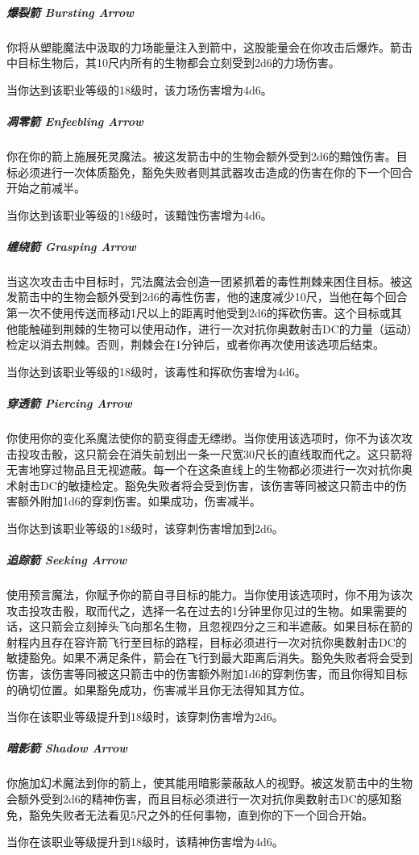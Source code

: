 \subparagraph{爆裂箭 Bursting Arrow}你将从塑能魔法中汲取的力场能量注入到箭中，这股能量会在你攻击后爆炸。箭击中目标生物后，其10尺内所有的生物都会立刻受到2d6的力场伤害。

当你达到该职业等级的18级时，该力场伤害增为4d6。

\subparagraph{凋零箭 Enfeebling Arrow}你在你的箭上施展死灵魔法。被这发箭击中的生物会额外受到2d6的黯蚀伤害。目标必须进行一次体质豁免，豁免失败者则其武器攻击造成的伤害在你的下一个回合开始之前减半。

当你达到该职业等级的18级时，该黯蚀伤害增为4d6。

\subparagraph{缠绕箭 Grasping Arrow}当这次攻击击中目标时，咒法魔法会创造一团紧抓着的毒性荆棘来困住目标。被这发箭击中的生物会额外受到2d6的毒性伤害，他的速度减少10尺，当他在每个回合第一次不使用传送而移动1尺以上的距离时他受到2d6的挥砍伤害。这个目标或其他能触碰到荆棘的生物可以使用动作，进行一次对抗你奥数射击DC的力量（运动）检定以消去荆棘。否则，荆棘会在1分钟后，或者你再次使用该选项后结束。

当你达到该职业等级的18级时，该毒性和挥砍伤害增为4d6。

\subparagraph{穿透箭 Piercing Arrow}你使用你的变化系魔法使你的箭变得虚无缥缈。当你使用该选项时，你不为该次攻击投攻击骰，这只箭会在消失前划出一条一尺宽30尺长的直线取而代之。这只箭将无害地穿过物品且无视遮蔽。每一个在这条直线上的生物都必须进行一次对抗你奥术射击DC的敏捷检定。豁免失败者将会受到伤害，该伤害等同被这只箭击中的伤害额外附加1d6的穿刺伤害。如果成功，伤害减半。

当你达到该职业等级的18级时，该穿刺伤害增加到2d6。

\subparagraph{追踪箭 Seeking Arrow}使用预言魔法，你赋予你的箭自寻目标的能力。当你使用该选项时，你不用为该次攻击投攻击骰，取而代之，选择一名在过去的1分钟里你见过的生物。如果需要的话，这只箭会立刻掉头飞向那名生物，且忽视四分之三和半遮蔽。如果目标在箭的射程内且存在容许箭飞行至目标的路程，目标必须进行一次对抗你奥数射击DC的敏捷豁免。如果不满足条件，箭会在飞行到最大距离后消失。豁免失败者将会受到伤害，该伤害等同被这只箭击中的伤害额外附加1d6的穿刺伤害，而且你得知目标的确切位置。如果豁免成功，伤害减半且你无法得知其方位。

当你在该职业等级提升到18级时，该穿刺伤害增为2d6。

\subparagraph{暗影箭 Shadow Arrow}你施加幻术魔法到你的箭上，使其能用暗影蒙蔽敌人的视野。被这发箭击中的生物会额外受到2d6的精神伤害，而且目标必须进行一次对抗你奥数射击DC的感知豁免，豁免失败者无法看见5尺之外的任何事物，直到你的下一个回合开始。

当你在该职业等级提升到18级时，该精神伤害增为4d6。

